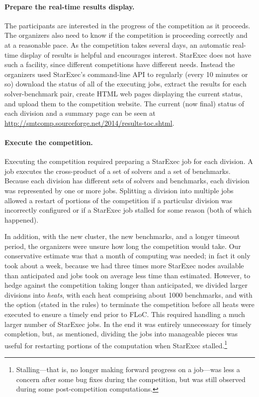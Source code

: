 \documentclass[twoside,11pt]{article}
\begin{document}
\paragraph{Prepare the real-time results display.} The participants are interested in the progress of the competition as it proceeds. The organizers also need to know if the competition is proceeding correctly and at a reasonable pace. As the competition takes several days, an automatic real-time display of results is helpful and encourages interest.  StarExec does not have such a facility, since different competitions have different needs. Instead the organizers used StarExec's command-line API to regularly (every 10 minutes or so) download the status of all of the executing jobs, extract the results for each solver-benchmark pair, create HTML web pages displaying the current status, and upload them to the competition website. The current (now final) status of each division and a summary page can be seen at \url{http://smtcomp.sourceforge.net/2014/results-toc.shtml}.

\paragraph{Execute the competition.} Executing the competition required preparing a StarExec job for each
division. A job executes the cross-product of a set of solvers and a set of benchmarks. Because each division has different sets of solvers and benchmarks, each division was represented by one or more jobs. Splitting a division into multiple jobs allowed a restart of portions of the competition if a particular division was incorrectly configured or if a StarExec job stalled for some reason (both of which happened).

In addition, with the new cluster, the new benchmarks, and a longer timeout period, the organizers were unsure how long the competition would take. Our conservative estimate was that a month of computing was needed; in fact it only took about a week, because we had three times more StarExec nodes available than anticipated and jobs took on average less time than estimated. However, to hedge against the competition taking longer than anticipated, we divided larger divisions into \emph{heats}, with each heat comprising about 1000 benchmarks, and with the option (stated in the rules) to terminate the competition before all heats were executed to ensure a timely end prior to FLoC. This required handling a much larger number of StarExec jobs. In the end it was entirely unnecessary for timely completion, but, as mentioned, dividing the jobs into manageable pieces was useful for restarting portions of the computation when StarExec stalled.\footnote{Stalling---that is, no longer making forward progress on a job---was less a concern after some bug fixes during the competition, but was still observed during some post-competition computations.}
\end{document}
